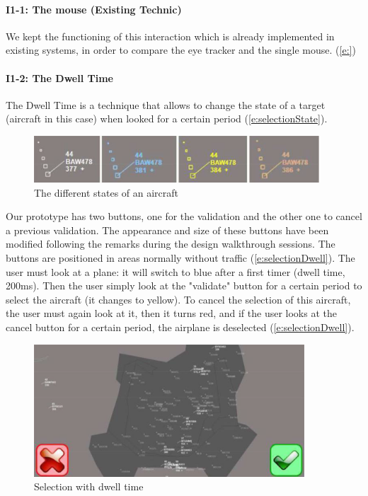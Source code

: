 \paragraph{I1-1: The mouse (Existing Technic)}

We kept the functioning of this interaction which is already
implemented in existing systems, in order to compare the
eye tracker and the single mouse. (\autoref{e:})


\paragraph{I1-2: The Dwell Time}
The Dwell Time is a technique that allows to change the
state of a target (aircraft in this case) when looked for a
certain period (\autoref{e:selectionState}).

\begin{figure}
 \centering
	\includegraphics[width=0.95\textwidth]{Figures/selectionState.png}
	\caption{ The different states of an aircraft}
	\label{e:selectionState}
\end{figure}

Our prototype has two buttons, one for the validation and the
other one to cancel a previous validation. The appearance
and size of these buttons have been modified following the
remarks during the design walkthrough sessions. The
buttons are positioned in areas normally without traffic
(\autoref{e:selectionDwell}). The user must look at a plane: it will switch to
blue after a first timer (dwell time, 200ms). Then the user
simply look at the "validate" button for a certain period to
select the aircraft (it changes to yellow). To cancel the
selection of this aircraft, the user must again look at it, then it turns red, and if the user looks at the cancel
button for a certain period, the airplane is deselected (\autoref{e:selectionDwell}).

\begin{figure}
 \centering
	\includegraphics[width=0.90\textwidth]{Figures/selectionDwell.png}
	\caption{ Selection with dwell time}
	\label{e:selectionDwell}
\end{figure}



